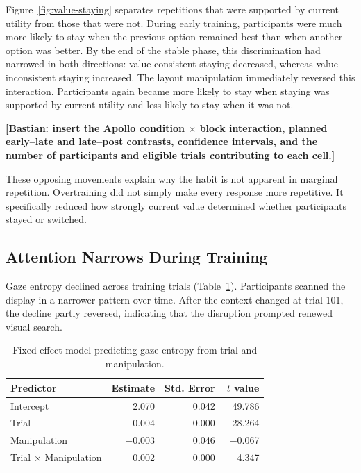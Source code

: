 \documentclass[man,natbib,floatsintext]{apa7}
\begin{document}
Figure~\ref{fig:value-staying} separates repetitions that were supported by current utility from those that were not. During early training, participants were much more likely to stay when the previous option remained best than when another option was better. By the end of the stable phase, this discrimination had narrowed in both directions: value-consistent staying decreased, whereas value-inconsistent staying increased. The layout manipulation immediately reversed this interaction. Participants again became more likely to stay when staying was supported by current utility and less likely to stay when it was not.

\textbf{[Bastian: insert the Apollo condition $\times$ block interaction, planned early--late and late--post contrasts, confidence intervals, and the number of participants and eligible trials contributing to each cell.]}

These opposing movements explain why the habit is not apparent in marginal repetition. Overtraining did not simply make every response more repetitive. It specifically reduced how strongly current value determined whether participants stayed or switched.

\subsection{Attention Narrows During Training}

Gaze entropy declined across training trials (Table~\ref{tab:entropy-model}). Participants scanned the display in a narrower pattern over time. After the context changed at trial 101, the decline partly reversed, indicating that the disruption prompted renewed visual search.

\begin{table}[H]
\centering
\caption{Fixed-effect model predicting gaze entropy from trial and manipulation.}
\label{tab:entropy-model}
\begin{tabular}{lrrr}
\toprule
Predictor & Estimate & Std. Error & $t$ value \\
\midrule
Intercept & 2.070 & 0.042 & 49.786 \\
Trial & $-$0.004 & 0.000 & $-$28.264 \\
Manipulation & $-$0.003 & 0.046 & $-$0.067 \\
Trial $\times$ Manipulation & 0.002 & 0.000 & 4.347 \\
\bottomrule
\end{tabular}
\end{table}
\end{document}
